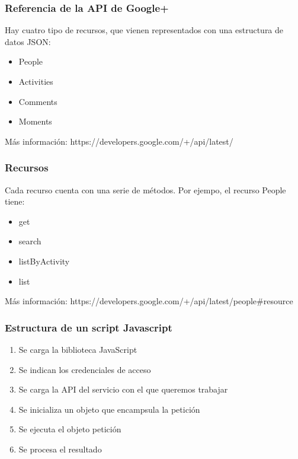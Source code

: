 
\begin{frame}
\frametitle{Referencia de la API de Google+}

Hay cuatro tipo de recursos, que vienen representados con una estructura
de datos JSON:

\begin{itemize}
  \item People
  \item Activities
  \item Comments
  \item Moments
\end{itemize}

Más información: https://developers.google.com/+/api/latest/

\end{frame}



\begin{frame}
\frametitle{Recursos}

Cada recurso cuenta con una serie de métodos. Por ejempo, el recurso
People tiene:

\begin{itemize}
  \item get
  \item search
  \item listByActivity
  \item list
\end{itemize}

Más información: https://developers.google.com/+/api/latest/people\#resource

\end{frame}



\begin{frame}
\frametitle{Estructura de un script Javascript}

\begin{enumerate}
  \item Se carga la biblioteca JavaScript
  \item Se indican los credenciales de acceso
  \item Se carga la API del servicio con el que queremos trabajar
  \item Se inicializa un objeto que encampsula la petición
  \item Se ejecuta el objeto petición
  \item Se procesa el resultado
\end{enumerate}

\end{frame}


